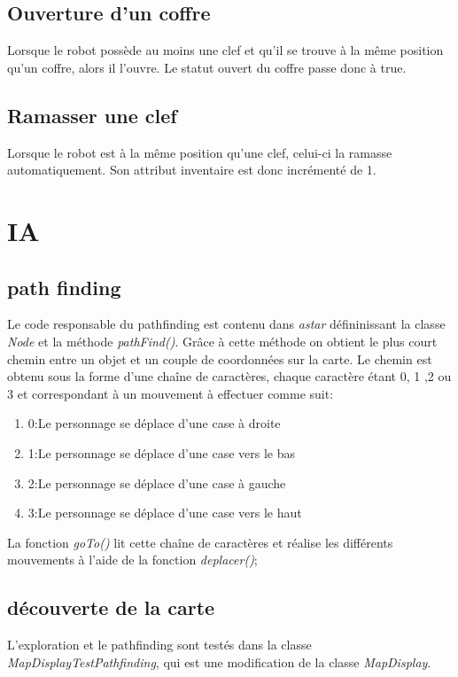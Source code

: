 \documentclass[a4paper 12pts]{article}
\begin{document}
\subsection {Ouverture d'un coffre}

Lorsque le robot possède au moins une clef et qu'il se trouve à la même position qu'un coffre, alors il l'ouvre. Le statut ouvert du coffre passe donc à true.

\subsection {Ramasser une clef}

Lorsque le robot est à la même position qu'une clef, celui-ci la ramasse automatiquement. Son attribut inventaire est donc incrémenté de 1.



\section{IA}

\subsection{path finding}
Le code responsable du pathfinding est contenu dans \emph{astar} défininissant la classe \emph{Node} et la méthode \emph{pathFind()}. Grâce à cette méthode on obtient le plus court chemin entre un objet et un couple de coordonnées sur la carte. Le chemin est obtenu sous la forme d'une chaîne de caractères, chaque caractère étant 0, 1 ,2 ou 3 et correspondant à un mouvement à effectuer comme suit:
\begin{enumerate}
\item 0:Le personnage se déplace d'une case à droite
\item 1:Le personnage se déplace d'une case vers le bas
\item 2:Le personnage se déplace d'une case à gauche
\item 3:Le personnage se déplace d'une case vers le haut
\end{enumerate}

La fonction \emph{goTo()} lit cette chaîne de caractères et réalise les différents mouvements à l'aide de la fonction \emph{deplacer()};
\subsection{découverte de la carte}
L'exploration et le pathfinding sont testés dans la classe \emph{MapDisplayTestPathfinding}, qui est une modification de la classe \emph{MapDisplay}.
\end{document}
